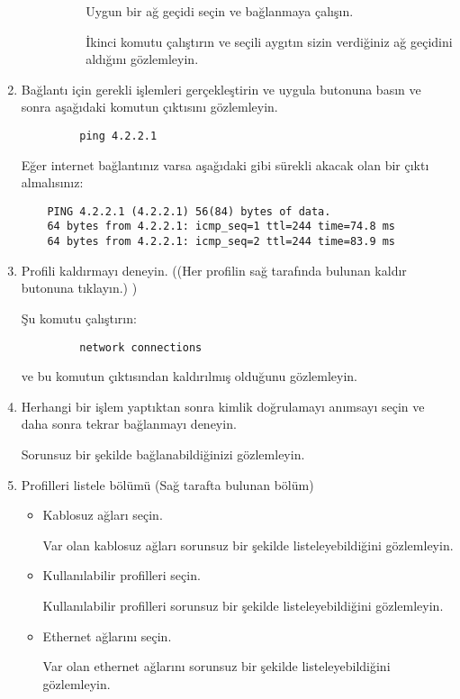 \documentclass[a4paper,10pt]{article}
\begin{document}
\begin{enumerate}
\begin{enumerate}
\begin{enumerate}
\begin{itemize}
			Uygun bir ağ geçidi seçin ve bağlanmaya çalışın.
		     
		      İkinci komutu çalıştırın ve seçili aygıtın sizin verdiğiniz ağ geçidini aldığını gözlemleyin.
		\end{itemize}
	      \end{enumerate}
	  
	
      \end{enumerate}

	\item Bağlantı için gerekli işlemleri gerçekleştirin ve uygula butonuna basın ve sonra aşağıdaki komutun çıktısını gözlemleyin.
		\begin{verbatim}
		 ping 4.2.2.1
		\end{verbatim}

	Eğer internet bağlantınız varsa aşağıdaki gibi sürekli akacak olan bir çıktı almalısınız:
	\begin{verbatim}
	PING 4.2.2.1 (4.2.2.1) 56(84) bytes of data.
	64 bytes from 4.2.2.1: icmp_seq=1 ttl=244 time=74.8 ms
	64 bytes from 4.2.2.1: icmp_seq=2 ttl=244 time=83.9 ms
      	\end{verbatim}

      \item Profili kaldırmayı deneyin. ((Her profilin sağ tarafında bulunan kaldır butonuna tıklayın.) )
      
	    Şu komutu çalıştırın:
	    \begin{verbatim}
	     network connections
	    \end{verbatim}
	    ve bu komutun çıktısından kaldırılmış olduğunu gözlemleyin.
	\item Herhangi bir işlem yaptıktan sonra kimlik doğrulamayı anımsayı seçin ve daha sonra tekrar bağlanmayı deneyin.
	
	Sorunsuz bir şekilde bağlanabildiğinizi gözlemleyin.
	\item Profilleri listele bölümü (Sağ tarafta bulunan bölüm)
	\begin{itemize}
	 \item Kablosuz ağları seçin.
	
	 Var olan kablosuz ağları sorunsuz bir şekilde listeleyebildiğini gözlemleyin.
	
 	\item Kullanılabilir profilleri seçin.
	
	Kullanılabilir profilleri sorunsuz bir şekilde listeleyebildiğini gözlemleyin.
	
	\item Ethernet ağlarını seçin.
	
	 Var olan ethernet ağlarını sorunsuz bir şekilde listeleyebildiğini gözlemleyin.
	
	\end{itemize}

\end{enumerate}
\end{document}
